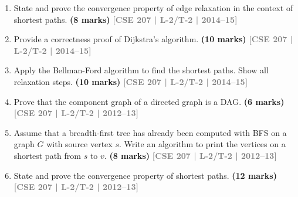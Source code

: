 \documentclass[12pt,a3paper]{article}
\newcommand{\yr}[1]{\hfill\textcolor{gray}{\small\textbf{[#1]}}}
\newcommand{\mk}[1]{\textcolor{orange!70!black}{\small\textbf{(#1 marks)}}}
\begin{document}
\begin{enumerate}
\item State and prove the convergence property of edge relaxation in the context of shortest paths. \mk{8}
\yr{CSE 207 | L-2/T-2 | 2014--15}

\item Provide a correctness proof of Dijkstra's algorithm. \mk{10}
\yr{CSE 207 | L-2/T-2 | 2014--15}

\item Apply the Bellman-Ford algorithm to find the shortest paths. Show all relaxation steps. \mk{10}
\yr{CSE 207 | L-2/T-2 | 2014--15}

\begin{center}

\end{center}

\item Prove that the component graph of a directed graph is a DAG. \mk{6}
\yr{CSE 207 | L-2/T-2 | 2012--13}

\item Assume that a breadth-first tree has already been computed with BFS on a graph $G$ with source vertex $s$. Write an algorithm to print the vertices on a shortest path from $s$ to $v$. \mk{8}
\yr{CSE 207 | L-2/T-2 | 2012--13}

\item State and prove the convergence property of shortest paths. \mk{12}
\yr{CSE 207 | L-2/T-2 | 2012--13}


\end{enumerate}
\end{document}
